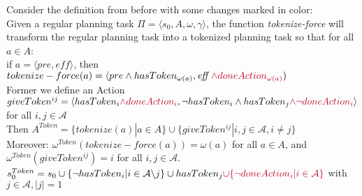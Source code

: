 Consider the definition from before with some changes marked in color: \\
Given a regular planning task $\Pi = \langle s_0, A, \omega, \gamma \rangle $, the function \textit{tokenize-force} will transform the regular planning task into a tokenized planning task so that for all $a \in A$: \\
 if $a = \langle pre, \textit{eff} \rangle$, then
   $tokenize-force(a) =\langle pre \wedge hasToken_{\omega(a)}, \textit{eff } {\color{UniRed} \wedge doneAction_{\omega(a)}})$ \\
Former we define an Action
    $ giveToken^{ij} = \langle hasToken_i {\color{UniRed}\wedge doneAction_i}, \neg hasToken_i \wedge hasToken_j {\color{UniRed} \wedge \neg doneAction_i} \rangle $
    for all $i,j \in \mathcal{A}$
    \\
Then $ A^{Token}=\{tokenize(a)|a \in A\} \cup \{giveToken^{ij}|i,j \in \mathcal{A}, i \not = j\}
$ \\
Moreover: $\omega^{Token}(tokenize-force(a))= \omega(a)$ for all $a \in A$,
and $\omega^{Token}(giveToken^{ij}) = i$ for all $i,j \in \mathcal{A}$. \\
$s_0^{Token} = s_0 \cup \{\neg hasToken_i|i \in \mathcal{A} \backslash j\} \cup hasToken_j {\color{UniRed} \cup  \{ \neg doneAction_i| i \in \mathcal{A} \}}$ with $j \in \mathcal{A}, |j|=1$\\

